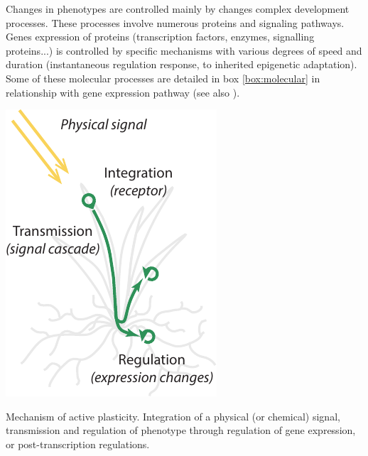 Changes in phenotypes are controlled mainly by changes complex development processes. These processes involve numerous proteins and signaling pathways. Genes expression of proteins (transcription factors, enzymes, signalling proteins...) is controlled by specific mechanisms with various degrees of speed and duration (instantaneous regulation response, to inherited epigenetic adaptation). Some of these molecular processes are detailed in box \ref{box:molecular} in relationship with gene expression pathway (see also \cite{nicotra_plant_2010}).


\begin{marginfigure}
    \includegraphics[width=1\linewidth]{./Figures/active_plasticity_m.pdf}
  \caption[Active plasticity]{Mechanism of active plasticity. Integration of a physical (or chemical) signal, transmission and regulation of phenotype through regulation of gene expression, or post-transcription regulations.}
  \label{fig:active_plasticity}
\end{marginfigure}

